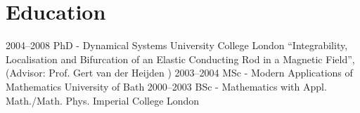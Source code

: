 \documentclass[english]{cv-style}
\begin{document}
\vfill

\vspace{-0.2cm}
\section{Education}
\vspace{-0.2cm}
\begin{entrylist}
\entry
{2004--2008}
{PhD \hspace{\diffpwidth/2}-\hspace{\diffpwidth/2} Dynamical Systems}
{%
University College London%
}%
{\enquote{Integrability, Localisation and Bifurcation of an Elastic Conducting Rod in a  Magnetic Field}, (Advisor: Prof. Gert van der Heijden%
)}
\vspace*{-0.5cm}\entry
{2003--2004}
{MSc - Modern Applications of Mathematics}
{%
University of Bath%
}%
{}
\vspace*{-0.5cm}\entry
{2000--2003}
{BSc \hspace{\diffbwidth/2}-\hspace{\diffbwidth/2} Mathematics with Appl. Math./Math. Phys.}
{%
Imperial College London%
}%
{}

\end{entrylist}



\vfill
\end{document}

